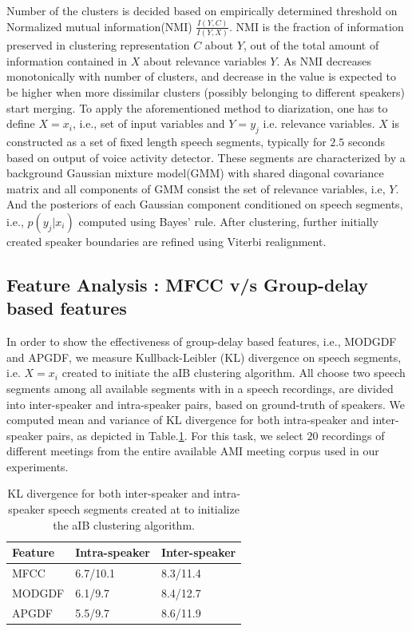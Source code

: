 \documentclass[conference]{IEEEtran}
\begin{document}
Number of the clusters is decided based on empirically determined threshold on Normalized mutual information(NMI) $\frac{I(Y,C)}{I(Y,X)}$. NMI is the fraction of information preserved in clustering representation $C$ about $Y$, out of the total amount of information contained in $X$ about relevance variables $Y$. As NMI decreases monotonically with number of clusters, and decrease in the value is expected to be higher when more dissimilar clusters (possibly belonging to different speakers) start merging. To apply the aforementioned method to diarization, one has to define $X = {x_i}$, i.e., set of input variables and $Y = {y_j}$ i.e. relevance variables. $X$ is constructed as a set of fixed length speech segments, typically for $2.5$ seconds based on output of voice activity detector. These segments are characterized by a background Gaussian mixture model(GMM) with shared diagonal covariance matrix and all components of GMM consist the set of relevance variables, i.e, $Y$. And the posteriors of each Gaussian component conditioned on speech segments, i.e., $p(y_j|x_i)$ computed using Bayes' rule. After clustering, further initially created speaker boundaries are refined using Viterbi realignment.

\subsection{Feature Analysis : MFCC v/s Group-delay based features}

In order to show the effectiveness of group-delay based features, i.e., MODGDF and APGDF, we measure Kullback-Leibler (KL) divergence on speech segments, i.e. $X={x_i}$ created to initiate the aIB clustering algorithm. All choose two speech segments among all available segments with in a speech recordings, are divided into inter-speaker and intra-speaker pairs, based on ground-truth of speakers. We computed mean and variance of KL divergence for both intra-speaker and inter-speaker pairs, as depicted in Table.\ref{table:kl-div}. For this task, we select $20$ recordings of different meetings from the entire available AMI meeting corpus used in our experiments. 


\begin{table}[h]
\centering

\label{table:kl-div}
\begin{tabular}{|l|l|l|}
\hline
Feature 			& Intra-speaker 			& Inter-speaker 	 \\ \hline
MFCC          			& 6.7/10.1               & 8.3/11.4       \\ \hline
MODGDF        			& 6.1/9.7                & 8.4/12.7       \\ \hline
APGDF         			& 5.5/9.7                & 8.6/11.9        \\ \hline
\end{tabular}

\vspace{0.4cm}
\caption{KL divergence for both inter-speaker and intra-speaker speech segments created at to initialize the aIB clustering algorithm.}
\end{table}
\end{document}
